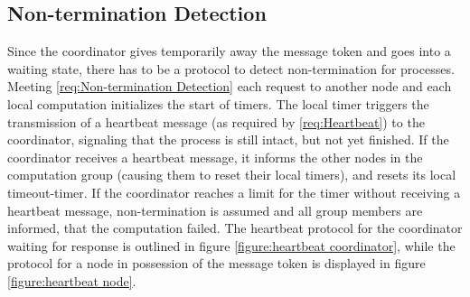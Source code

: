 \subsection{Non-termination Detection} \label{Non-termination Detection}

Since the coordinator gives temporarily away the message token and goes into a waiting state, there has to be a protocol to detect non-termination for processes. Meeting \ref{req:Non-termination Detection} each request to another node and each local computation initializes the start of timers. The local timer triggers the transmission of a heartbeat message (as required by \ref{req:Heartbeat}) to the coordinator, signaling that the process is still intact, but not yet finished. If the coordinator receives a heartbeat message, it informs the other nodes in the computation group (causing them to reset their local timers), and resets its local timeout-timer. If the coordinator reaches a limit for the timer without receiving a heartbeat message, non-termination is assumed and all group members are informed, that the computation failed. The heartbeat protocol for the coordinator waiting for response is outlined in figure \ref{figure:heartbeat coordinator}, while the protocol for a node in possession of the message token is displayed in figure \ref{figure:heartbeat node}.  


